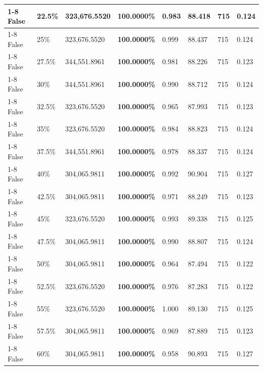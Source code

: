 \begin{table}[H]
\begin{tabular}{lllrllll}
\cline{1-8} \cline{2-8}
False & 22.5\% & 323,676.5520 & \bfseries \color{red} 100.0000\% & 0.983 & 88.418 & 715 & 0.124 \\
\cline{1-8} \cline{2-8}
False & 25\% & 323,676.5520 & \bfseries \color{red} 100.0000\% & 0.999 & 88.437 & 715 & 0.124 \\
\cline{1-8} \cline{2-8}
False & 27.5\% & 344,551.8961 & \bfseries \color{red} 100.0000\% & 0.981 & 88.226 & 715 & 0.123 \\
\cline{1-8} \cline{2-8}
False & 30\% & 344,551.8961 & \bfseries \color{red} 100.0000\% & 0.990 & 88.712 & 715 & 0.124 \\
\cline{1-8} \cline{2-8}
False & 32.5\% & 323,676.5520 & \bfseries \color{red} 100.0000\% & 0.965 & 87.993 & 715 & 0.123 \\
\cline{1-8} \cline{2-8}
False & 35\% & 323,676.5520 & \bfseries \color{red} 100.0000\% & 0.984 & 88.823 & 715 & 0.124 \\
\cline{1-8} \cline{2-8}
False & 37.5\% & 344,551.8961 & \bfseries \color{red} 100.0000\% & 0.978 & 88.337 & 715 & 0.124 \\
\cline{1-8} \cline{2-8}
False & 40\% & \color{red} 304,065.9811 & \bfseries \color{red} 100.0000\% & 0.992 & 90.904 & 715 & 0.127 \\
\cline{1-8} \cline{2-8}
False & 42.5\% & \color{red} 304,065.9811 & \bfseries \color{red} 100.0000\% & 0.971 & 88.249 & 715 & 0.123 \\
\cline{1-8} \cline{2-8}
False & 45\% & 323,676.5520 & \bfseries \color{red} 100.0000\% & 0.993 & 89.338 & 715 & 0.125 \\
\cline{1-8} \cline{2-8}
False & 47.5\% & \color{red} 304,065.9811 & \bfseries \color{red} 100.0000\% & 0.990 & 88.807 & 715 & 0.124 \\
\cline{1-8} \cline{2-8}
False & 50\% & \color{red} 304,065.9811 & \bfseries \color{red} 100.0000\% & 0.964 & 87.494 & 715 & 0.122 \\
\cline{1-8} \cline{2-8}
False & 52.5\% & 323,676.5520 & \bfseries \color{red} 100.0000\% & 0.976 & 87.283 & 715 & 0.122 \\
\cline{1-8} \cline{2-8}
False & 55\% & 323,676.5520 & \bfseries \color{red} 100.0000\% & 1.000 & 89.130 & 715 & 0.125 \\
\cline{1-8} \cline{2-8}
False & 57.5\% & \color{red} 304,065.9811 & \bfseries \color{red} 100.0000\% & 0.969 & 87.889 & 715 & 0.123 \\
\cline{1-8} \cline{2-8}
False & 60\% & \color{red} 304,065.9811 & \bfseries \color{red} 100.0000\% & 0.958 & 90.893 & 715 & 0.127 \\

\end{tabular}
\end{table}
